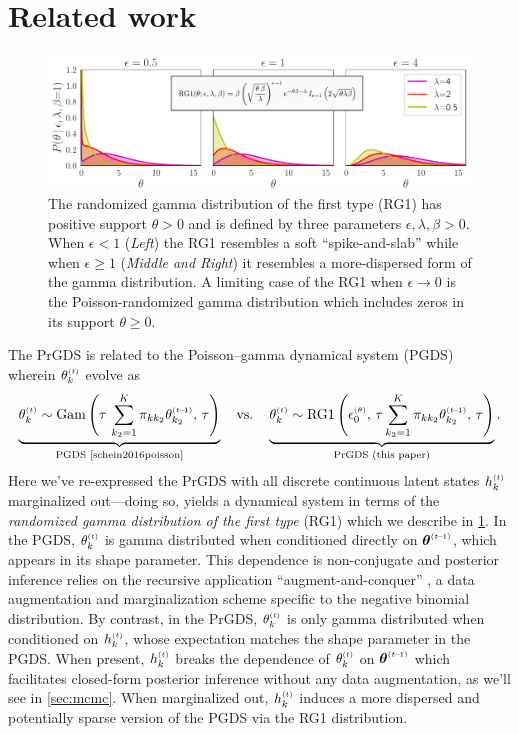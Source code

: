 \documentclass{article}
\begin{document}
\section{Related work}
\label{sec:bg}
\begin{figure}[t]
\centering
\includegraphics[width=\linewidth]{../../fig/distributions/annotated_rg1.pdf}
\caption{\footnotesize \label{fig:rg1} The randomized gamma distribution of the first type (RG1) \cite{yuan2000bessel,makarov2010exact} has positive support $\theta \!>\!  0$ and is defined by three parameters $\epsilon,\lambda,\beta \!>\! 0$. When $\epsilon < 1$ (\emph{Left}) the RG1 resembles a soft ``spike-and-slab'' while when $\epsilon \geq 1$ (\emph{Middle and Right}) it resembles a more-dispersed form of the gamma distribution. A limiting case of the RG1 when $\epsilon \!\rightarrow\! 0$ is the Poisson-randomized gamma distribution \cite{zhou2016augmentable} which includes zeros in its support $\theta \geq 0$.~}
\end{figure}
The PrGDS is related to the Poisson--gamma dynamical system (PGDS)~\citep{schein2016poisson} wherein $\thetakt$ evolve as~
\begin{equation}
\label{eq:pgds_thetakt}
\underbrace{\thetakt \sim \Gam{\tau\,\sum_{k_2=1}^K \pi_{kk_2} \thetakttm,\, \tau}}_{\textrm{PGDS \cite{schein2016poisson}}}
% 
\hspace{1em}\textrm{vs.}\hspace{1em} 
% 
\underbrace{\thetakt \sim \textrm{RG1}\left(\epstheta,\,\tau\sum_{k_2=1}^K \pi_{kk_2} \thetakttm,\, \tau\right)}_{\textrm{PrGDS (this paper)}}.
\end{equation}
Here we've re-expressed the PrGDS with all discrete continuous latent states $\hkt$ marginalized out---doing so, yields a dynamical system in terms of the \emph{randomized gamma distribution of the first type} (RG1) \cite{yuan2000bessel,makarov2010exact} which we describe in \cref{fig:rg1}. In the PGDS, $\thetakt$ is gamma distributed when conditioned directly on $\boldsymbol{\theta}^{\mathsmaller{(t \tm 1)}}$, which appears in its shape parameter. This dependence is non-conjugate and posterior inference relies on the recursive application ``augment-and-conquer'' \cite{zhou2012augment-and-conquer}, a data augmentation and marginalization scheme specific to the negative binomial distribution. By contrast, in the PrGDS, $\thetakt$ is only gamma distributed when conditioned on $\hkt$, whose expectation matches the shape parameter in the PGDS. When present, $\hkt$ breaks the dependence of $\thetakt$ on $\boldsymbol{\theta}^{\mathsmaller{(t \tm 1)}}$ which facilitates closed-form posterior inference without any data augmentation, as we'll see in \cref{sec:mcmc}. When marginalized out, $\hkt$ induces a more dispersed and potentially sparse version of the PGDS via the RG1 distribution.
\end{document}

